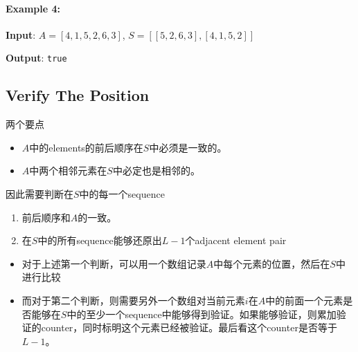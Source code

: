 \paragraph{Example 4:}

\begin{flushleft}
\textbf{Input}: $A= [4,1,5,2,6,3]$, $S = [[5,2,6,3],[4,1,5,2]]$

\textbf{Output}: \texttt{true}
\end{flushleft}

\subsection{Verify The Position}
两个要点
\begin{itemize}
\item $A$中的elements的前后顺序在$S$中必须是一致的。
\item $A$中两个相邻元素在$S$中必定也是相邻的。
\end{itemize}

因此需要判断在$S$中的每一个sequence
\begin{enumerate}
\item 前后顺序和$A$的一致。
\item 在$S$中的所有sequence能够还原出$L-1$个adjacent element pair
\end{enumerate}

\begin{itemize}
\item 对于上述第一个判断，可以用一个数组记录$A$中每个元素的位置，然后在$S$中进行比较
\item 而对于第二个判断，则需要另外一个数组对当前元素$i$在$A$中的前面一个元素是否能够在$S$中的至少一个sequence中能够得到验证。如果能够验证，则累加验证的counter，同时标明这个元素已经被验证。最后看这个counter是否等于$L-1$。
\end{itemize}

